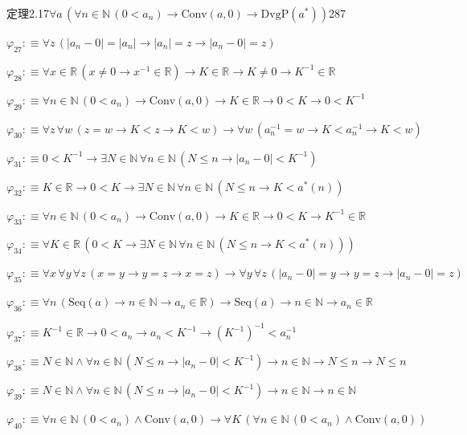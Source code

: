 \begin{fullproof}{定理2.17}{$\forall a\,(\forall n \in \mathbb{N}\,(0 < a_{n}) \to \mathrm{Conv}(a,0) \to \mathrm{DvgP}(a^{\ast}))$}{287}
\begin{abbrevlist}
\item $\varphi_{27} :\equiv \forall z\,(\lvert a_{n} - 0 \rvert = \lvert a_{n} \rvert \to \lvert a_{n} \rvert = z \to \lvert a_{n} - 0 \rvert = z)$
\item $\varphi_{28} :\equiv \forall x \in \mathbb{R}\,(x \neq 0 \to x^{-1} \in \mathbb{R}) \to K \in \mathbb{R} \to K \neq 0 \to K^{-1} \in \mathbb{R}$
\item $\varphi_{29} :\equiv \forall n \in \mathbb{N}\,(0 < a_{n}) \to \mathrm{Conv}(a,0) \to K \in \mathbb{R} \to 0 < K \to 0 < K^{-1}$
\item $\varphi_{30} :\equiv \forall z\,\forall w\,(z = w \to K < z \to K < w) \to \forall w\,(a_{n}^{-1} = w \to K < a_{n}^{-1} \to K < w)$
\item $\varphi_{31} :\equiv 0 < K^{-1} \to \exists N \in \mathbb{N}\,\forall n \in \mathbb{N}\,(N \leq n \to \lvert a_{n} - 0 \rvert < K^{-1})$
\item $\varphi_{32} :\equiv K \in \mathbb{R} \to 0 < K \to \exists N \in \mathbb{N}\,\forall n \in \mathbb{N}\,(N \leq n \to K < a^{\ast}(n))$
\item $\varphi_{33} :\equiv \forall n \in \mathbb{N}\,(0 < a_{n}) \to \mathrm{Conv}(a,0) \to K \in \mathbb{R} \to 0 < K \to K^{-1} \in \mathbb{R}$
\item $\varphi_{34} :\equiv \forall K \in \mathbb{R}\,(0 < K \to \exists N \in \mathbb{N}\,\forall n \in \mathbb{N}\,(N \leq n \to K < a^{\ast}(n)))$
\item $\varphi_{35} :\equiv \forall x\,\forall y\,\forall z\,(x = y \to y = z \to x = z) \to \forall y\,\forall z\,(\lvert a_{n} - 0 \rvert = y \to y = z \to \lvert a_{n} - 0 \rvert = z)$
\item $\varphi_{36} :\equiv \forall n\,(\mathrm{Seq}(a) \to n \in \mathbb{N} \to a_{n} \in \mathbb{R}) \to \mathrm{Seq}(a) \to n \in \mathbb{N} \to a_{n} \in \mathbb{R}$
\item $\varphi_{37} :\equiv K^{-1} \in \mathbb{R} \to 0 < a_{n} \to a_{n} < K^{-1} \to (K^{-1})^{-1} < a_{n}^{-1}$
\item $\varphi_{38} :\equiv N \in \mathbb{N} \land \forall n \in \mathbb{N}\,(N \leq n \to \lvert a_{n} - 0 \rvert < K^{-1}) \to n \in \mathbb{N} \to N \leq n \to N \leq n$
\item $\varphi_{39} :\equiv N \in \mathbb{N} \land \forall n \in \mathbb{N}\,(N \leq n \to \lvert a_{n} - 0 \rvert < K^{-1}) \to n \in \mathbb{N} \to n \in \mathbb{N}$
\item $\varphi_{40} :\equiv \forall n \in \mathbb{N}\,(0 < a_{n}) \land \mathrm{Conv}(a,0) \to \forall K\,(\forall n \in \mathbb{N}\,(0 < a_{n}) \land \mathrm{Conv}(a,0))$

\end{abbrevlist}
\end{fullproof}
